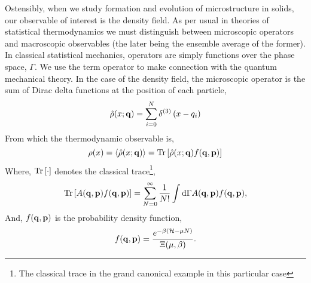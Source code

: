 Ostensibly, when we study formation and evolution of microstructure in solids,
our observable of interest is the density field.  As per usual in theories of
statistical thermodynamics we must distinguish between microscopic operators
and macroscopic observables (the later being the ensemble average of the
former).  In classical statistical mechanics, operators are simply functions
over the phase space, $\Gamma$.  We use the term operator to make connection
with the quantum mechanical theory.  In the case of the density field, the
microscopic operator is the sum of Dirac delta functions at the position of each
particle,
%
\begin{equation} 
    \hat{\rho}(x; \mathbf{q}) = \sum_{i = 0}^N \delta^{(3)}\left(x - q_i\right)
\end{equation}
%
From which the thermodynamic observable is, 
%
\begin{equation} 
    \label{mean_density} 
    \rho(x) = \left\langle \hat{\rho}(x; \mathbf{q}) \right\rangle = 
        \mathrm{Tr}\left[ \hat{\rho}(x; \mathbf{q}) f(\mathbf{q}, \mathbf{p}) \right]
\end{equation}
%
Where, $\mathrm{Tr}\left[ \cdot \right]$ denotes the classical trace\footnote{The classical trace
in the grand canonical example in this particular case},
%
\begin{equation}
    \mathrm{Tr}\left[ A(\mathbf{q}, \mathbf{p}) f(\mathbf{q}, \mathbf{p}) \right] = \sum_{N =0}^\infty
        \frac{1}{N!}\int\mathrm{d}\Gamma A(\mathbf{q}, \mathbf{p}) f(\mathbf{q}, \mathbf{p}), 
\end{equation}
%
And, $f(\mathbf{q}, \mathbf{p})$ is the probability density function,
%
\begin{equation} 
    f(\mathbf{q}, \mathbf{p}) = \frac{e^{-\beta (\mathcal{H} - \mu N)}}{\Xi(\mu, \beta)}.
\end{equation}
%

